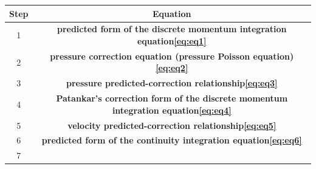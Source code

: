 \documentclass[12pt]{article}
\theoremstyle{plain}  %
\theoremstyle{definition}  %
\begin{document}
\begin{table}[H]
\centering
\begin{tabular}{|c|c|}
\hline
\rowcolor{orange!80}
\textbf{Step} & \textbf{Equation} \\
\hline
1 
& 
\begin{minipage}[c]{0.85\textwidth}
\centering
\vspace{0.3em}
\textbf{predicted form of the discrete momentum integration equation\eqref{eq:eq1}}
\vspace{0.3em}
\end{minipage} \\
\hline
2 & 
\begin{minipage}[c]{0.85\textwidth}
\centering
\vspace{0.3em}
\textbf{pressure correction equation (pressure Poisson equation)\eqref{eq:eq2}}
\vspace{0.3em}
\end{minipage} \\
\hline
3 & 
\begin{minipage}[c]{0.85\textwidth}
\centering
\vspace{0.3em}
\textbf{pressure predicted-correction relationship\eqref{eq:eq3}}
\vspace{0.3em}
\end{minipage} \\
\hline
4 & 
\begin{minipage}[c]{0.85\textwidth}
\centering
\vspace{0.3em}
\textbf{Patankar's correction form of the discrete momentum integration equation\eqref{eq:eq4}}
\vspace{0.3em}
\end{minipage} \\
\hline
5 & 
\begin{minipage}[c]{0.85\textwidth}
\centering
\vspace{0.3em}
\textbf{velocity predicted-correction relationship\eqref{eq:eq5}}
\vspace{0.3em}
\end{minipage} \\
\hline
6 & 
\begin{minipage}[c]{0.85\textwidth}
\centering
\vspace{0.3em}
\textbf{predicted form of the continuity integration equation\eqref{eq:eq6}}
\vspace{0.3em}
\end{minipage} \\
\hline
7 & 
\begin{minipage}[c]{0.85\textwidth}

\end{minipage}
\end{tabular}
\end{table}
\end{document}
